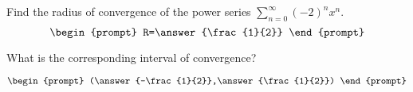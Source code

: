 \documentclass{ximera}
\author{Gregory Hartman \and Matthew Carr}
\begin{document}
\begin{exercise}




Find the radius of convergence of the power series $\sum_{n=0}^{\infty}(-2)^{n}x^{n}$.
\[
\begin{prompt}
R=\answer{\frac{1}{2}}
\end{prompt}
\]

What is the corresponding interval of convergence?

\[
\begin{prompt}
(\answer{-\frac{1}{2}},\answer{\frac{1}{2}})
\end{prompt}
\]

\end{exercise}
\end{document}
